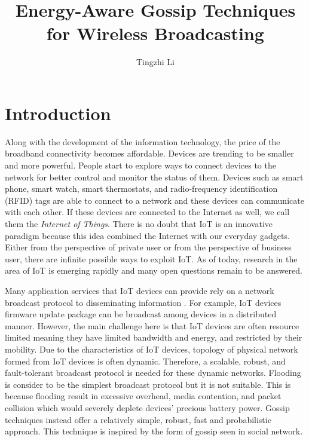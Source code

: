 \documentclass[onehalf,11pt]{beavtex}
\title{Energy-Aware Gossip Techniques for Wireless Broadcasting}
\author{Tingzhi Li}
\begin{document}
\maketitle

\mainmatter

\chapter{Introduction} \label{Chapter1}

Along with the development of the information technology, the price of the broadband connectivity becomes affordable. Devices are trending to be smaller and more powerful. People start to explore ways to connect devices to the network for better control and monitor the status of them. Devices such as smart phone, smart watch, smart thermostats, and radio-frequency identification (RFID) tags are able to connect to a network and these devices can communicate with each other. If these devices are connected to the Internet as well, we call them the \textit{Internet of Things}. There is no doubt that IoT is an innovative paradigm \cite{Atzori} because this idea combined the Internet with our everyday gadgets. Either from the perspective of private user or from the perspective of business user, there are infinite possible ways to exploit IoT. As of today, research in the area of IoT is emerging rapidly and many open questions remain to be answered.

Many application services that IoT devices can provide rely on a network broadcast protocol to disseminating information \cite{smart}. For example, IoT devices firmware update package can be broadcast among devices in a distributed manner. However, the main challenge here is that IoT devices are often resource limited meaning they have limited bandwidth and energy, and restricted by their mobility. Due to the characteristics of IoT devices, topology of physical network formed from IoT devices is often dynamic. Therefore, a scalable, robust, and fault-tolerant broadcast protocol is needed for these dynamic networks. Flooding is consider to be the simplest broadcast protocol but it is not suitable. This is because flooding result in excessive overhead, media contention, and packet collision \cite{tseng2002broadcast} which would severely deplete devices' precious battery power. Gossip techniques instead offer a relatively simple, robust, fast and probabilistic approach. This technique is inspired by the form of gossip seen in social network.
\end{document}
